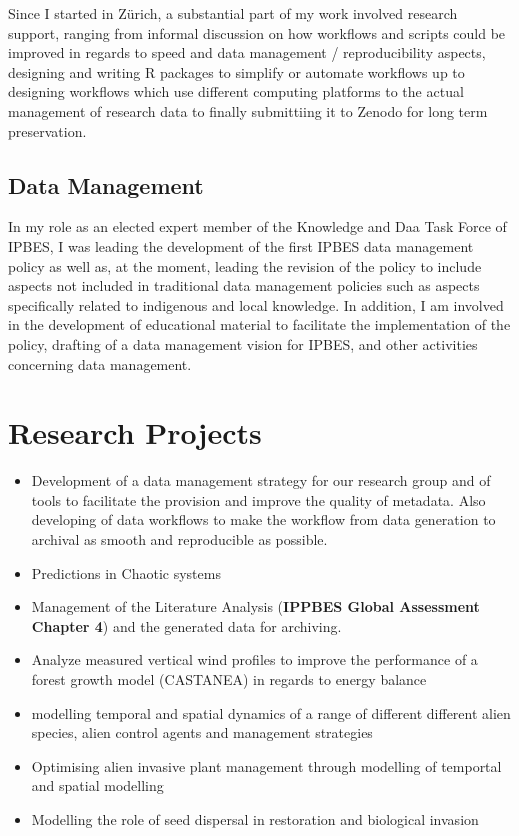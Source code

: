 \documentclass[a4paper]{article}
\begin{document}
Since I started in Zürich, a substantial part of my work involved research support, ranging from informal discussion on how workflows and scripts could be improved in regards to speed and data management / reproducibility aspects, designing and writing R packages to simplify or automate workflows up to designing workflows which use different computing platforms to the actual management of research data to finally submittiing it to Zenodo for long term preservation.

\subsection{Data Management}


In my role as an elected expert member of the Knowledge and Daa Task Force of IPBES, I was leading the development of the first IPBES data management policy as well as, at the moment, leading the revision of the policy to include aspects not included in traditional data management policies such as aspects specifically related to indigenous and local knowledge. 
In addition, I am involved in the development of educational material to facilitate the implementation of the policy, drafting of a data management vision for IPBES, and other activities concerning data management.


\section{Research Projects}

\begin{itemize}
\item Development of a data management strategy for our research group and of tools to facilitate the provision and
improve the quality of metadata. Also developing of data workflows to make the workflow from data generation to archival as smooth and reproducible as possible.
\item Predictions in Chaotic systems
\item Management of the Literature Analysis (\textbf{IPPBES Global Assessment Chapter 4}) and the generated data for archiving.
\item Analyze measured vertical wind profiles to improve the performance of a forest growth model (CASTANEA) in regards to energy balance
\item modelling temporal and spatial dynamics of a range of different different alien species, alien control agents and 
management strategies
\item Optimising alien invasive plant management through modelling of temportal and spatial modelling
\item Modelling the role of seed dispersal in restoration and biological invasion
\end{itemize}
\end{document}
